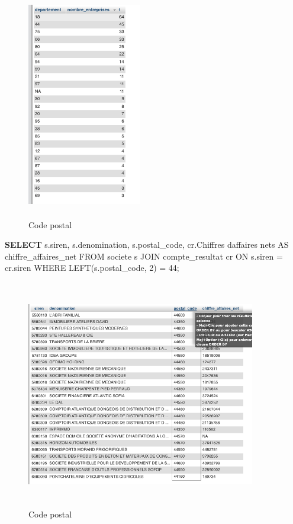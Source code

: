 \documentclass[mstat,12pt]{unswthesis}
\newenvironment{Shaded}{\begin{snugshade}}{\end{snugshade}}
\newcommand{\DecValTok}[1]{\textcolor[rgb]{0.00,0.00,0.81}{#1}}
\newcommand{\KeywordTok}[1]{\textcolor[rgb]{0.13,0.29,0.53}{\textbf{#1}}}
\newcommand{\NormalTok}[1]{#1}
\newcommand{\StringTok}[1]{\textcolor[rgb]{0.31,0.60,0.02}{#1}}
\begin{document}
\begin{figure}
\centering
\includegraphics[width=5cm,height=10cm]{image_sql/sql_1_Serdar.png}
\caption{Code postal}
\end{figure}

\newpage

\begin{Shaded}
\begin{Highlighting}[]
\KeywordTok{SELECT} 
\NormalTok{    s.siren,}
\NormalTok{    s.denomination,}
\NormalTok{    s.postal\_code,}
\NormalTok{    cr.\textasciigrave{}Chiffres d}\StringTok{\textquotesingle{}affaires nets\textasciigrave{} AS chiffre\_affaires\_net}
\StringTok{FROM }
\StringTok{    societe s}
\StringTok{JOIN }
\StringTok{    compte\_resultat cr ON s.siren = cr.siren}
\StringTok{WHERE }
\StringTok{    LEFT(s.postal\_code, 2) = \textquotesingle{}}\DecValTok{44}\StringTok{\textquotesingle{};}
\end{Highlighting}
\end{Shaded}

\begin{figure}
\centering
\includegraphics[width=10cm,height=10cm]{image_sql/sql_2_serdar.png}
\caption{Code postal}
\end{figure}
\end{document}
